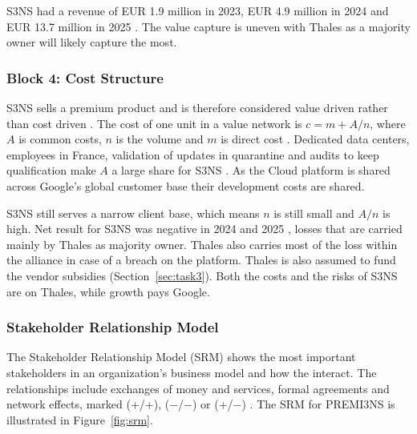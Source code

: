 S3NS had a revenue of EUR 1.9 million in 2023, EUR 4.9 million in 2024 and EUR 13.7 million in 2025 \parencite{pappers2026}. The value capture is uneven with Thales as a majority owner will likely capture the most. 

\subsubsection{Block 4: Cost Structure}

S3NS sells a premium product and is therefore considered value driven rather than cost driven \parencite[p.~41]{osterwalder2010}. The cost of one unit in a value network is $c = m + A/n$, where $A$ is common costs, $n$ is the volume and $m$ is direct cost \parencite[pp.~110--111]{overby2021}. Dedicated data centers, employees in France, validation of updates in quarantine and audits to keep qualification make $A$ a large share for S3NS \parencite{paperjam2026,s3ns2025premi3ns}. As the Cloud platform is shared across Google's global customer base their development costs are shared. 

S3NS still serves a narrow client base, which means $n$ is still small and $A/n$ is high. Net result for S3NS was negative in 2024 and 2025 \parencite{pappers2026}, losses that are carried mainly by Thales as majority owner. Thales also carries most of the loss within the alliance in case of a breach on the platform. Thales is also assumed to fund the vendor subsidies (Section~\ref{sec:task3}). Both the costs and the risks of S3NS are on Thales, while growth pays Google. 

\subsubsection{Stakeholder Relationship Model}

The Stakeholder Relationship Model (SRM) shows the most important stakeholders in an organization's business model and how the interact. The relationships include exchanges of money and services, formal agreements and network effects, marked (+/+), ($-$/$-$) or (+/$-$) \parencite[pp.~288--289]{overby2021}. The SRM for PREMI3NS is illustrated in Figure~\ref{fig:srm}.

